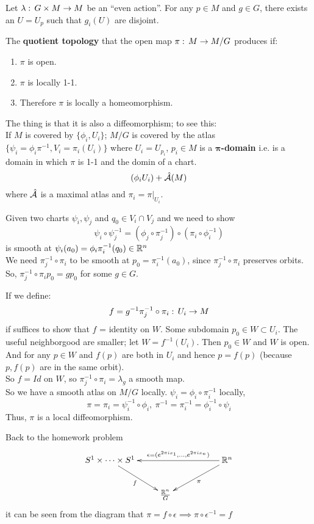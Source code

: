 Let $\lambda :\, G\times M \to M$ be an ``even action''. For any $p\in M$ and $g\in G$, there exists an $U = U_p$ such that $g_i(U)$ are disjoint. 
\begin{ddef}
The \textbf{quotient topology} that the open map $\pi:\, M\to M/G$ produces if:
\begin{enumerate}[1)]
\item $\pi$ is open.
\item $\pi$ is locally 1-1.
\item Therefore $\pi$ is locally a homeomorphism.
\end{enumerate}
\end{ddef}
The thing is that it is also a diffeomorphism; to see this:\\
If $M$ is covered by $\{\phi_i,U_i\}$; $M/G$ is covered by the atlas $\{\psi_i = \phi_i \pi^{-1}, V_i = \pi_i(U_i) \}$ where $U_i= U_{p_i}$, $p_i\in M$ is a \textbf{$\mathbf{\pi}$-domain} i.e. is a domain in which $\pi$ is 1-1 and the domin of a chart.
$$(\phi_i U_i) + \hat {\mathcal{A}}(M)$$
where $\hat {\mathcal{A}}$ is a maximal atlas and $\pi_i= \pi|_{U_i}$.

Given two charts $\psi_i,\psi_j $ and $q_0\in V_i\cap V_j$ and we need to show 
$$\psi_i \circ \psi_j ^{-1} = (\phi_j\circ \pi_j ^{-1} )\circ (\pi_i\circ \phi_i ^{-1} )$$
is smooth at $\psi_i(a_0)=\phi_i \pi_i ^{-1} (q_0) \in \mathbb{R}^n $ \\
We need $\pi_j ^{-1} \circ \pi_i$ to be smooth at $p_0=\pi_i ^{-1} (a_0)$, since $\pi_j ^{-1} \circ \pi_i$ preserves orbits. So, $\pi_j ^{-1} \circ \pi_i p_0 = gp_0$ for some $g\in G$. 

If we define:
$$f=g ^{-1} \pi_j ^{-1} \circ \pi_i:\, U_i\to M$$
if suffices to show that $f$ = identity on $W$. Some subdomain $p_0\in W \subset U_i$. The useful neighborgood are smaller; let $W=f ^{-1} (U_i)$. Then $p_0\in W$ and $W$ is open. And for any $p\in W$ and $f(p)$ are both in $U_i$ and hence $p=f(p)$ (because $p,f(p)$ are in the same orbit).\\
So $f=Id$ on $W$, so $\pi_j ^{-1} \circ \pi_i= \lambda_g$ a smooth map.\\
So we have a smooth atlas on $M/G$ locally. $\psi_i=\phi_i\circ \pi_i ^{-1} $ locally, 
$$\pi = \pi_i=\psi_i ^{-1} \circ \phi_i,\ \pi ^{-1} = \pi_i ^{-1} = \phi_i ^{-1} \circ \psi_i$$
Thus, $\pi$ is a local diffeomorphism.

Back to the homework problem
\begin{displaymath}
\xymatrix{ 
S^1\times \cdots \times S^1\ar[dr]_f  &&& \RRR^n\ar[lll]_-{\epsilon=(e^{2\pi i x_1},\ldots,e^{2\pi i x_n} )} \ar[lld]^\pi \\
                     & \frac{\RRR^n }{G} && }
\end{displaymath}
it can be seen from the diagram that $\pi=f\circ \epsilon \implies \pi\circ \epsilon ^{-1} =f$ 

